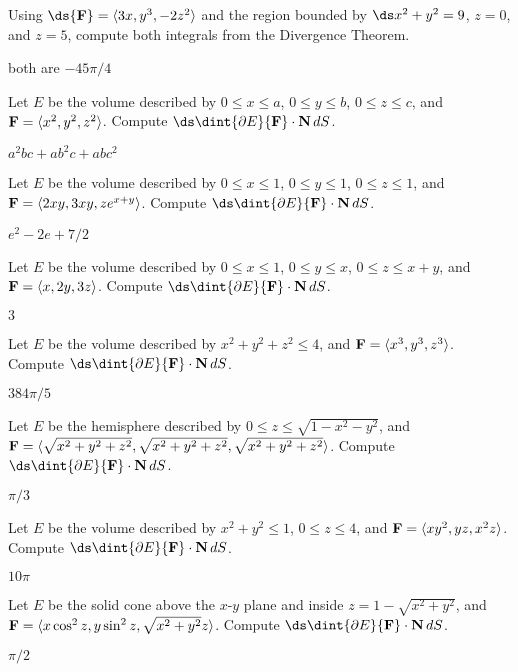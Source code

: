 \begin{exercises}

\exercise Using $\ds{\bf F}=\langle 3x,y^3,-2z^2\rangle$ and the
region bounded by $\ds x^2+y^2=9$, $z=0$, and $z=5$, compute both
integrals from the Divergence Theorem.
\begin{answer} both are $-45\pi/4$
\end{answer}

\exercise Let $E$ be the volume described by 
$0\le x\le a$, $0\le y\le b$, $0\le z\le c$, and 
${\bf F}= \langle x^2,y^2,z^2\rangle$. Compute
$\ds\dint{\partial E} {\bf F}\cdot {\bf N}\,dS$.
\begin{answer} $a^2bc+ab^2c+abc^2$
\end{answer}

\exercise Let $E$ be the volume described by 
$0\le x\le 1$, $0\le y\le 1$, $0\le z\le 1$, and 
${\bf F}= \langle 2xy,3xy,ze^{x+y}\rangle$. Compute
$\ds\dint{\partial E} {\bf F}\cdot {\bf N}\,dS$.
\begin{answer} $e^2-2e+7/2$
\end{answer}

\exercise Let $E$ be the volume described by 
$0\le x\le 1$, $0\le y\le x$, $0\le z\le x+y$, and 
${\bf F}= \langle x,2y,3z\rangle$. Compute
$\ds\dint{\partial E} {\bf F}\cdot {\bf N}\,dS$.
\begin{answer} $3$
\end{answer}

\exercise Let $E$ be the volume described by 
$x^2+y^2+z^2\le 4$, and 
${\bf F}= \langle x^3,y^3,z^3\rangle$. Compute
$\ds\dint{\partial E} {\bf F}\cdot {\bf N}\,dS$.
\begin{answer} $384\pi/5$
\end{answer}

\exercise Let $E$ be the hemisphere described by 
$0\le z\le \sqrt{1-x^2-y^2}$, and \hfill\break
${\bf F}= \langle \sqrt{x^2+y^2+z^2},\sqrt{x^2+y^2+z^2},
\sqrt{x^2+y^2+z^2}\rangle$. Compute
$\ds\dint{\partial E} {\bf F}\cdot {\bf N}\,dS$.
\begin{answer} $\pi/3$
\end{answer}

\exercise Let $E$ be the volume described by 
$x^2+y^2\le1$, $0\le z\le4$, and 
${\bf F}= \langle xy^2,yz,x^2z\rangle$. Compute
$\ds\dint{\partial E} {\bf F}\cdot {\bf N}\,dS$.
\begin{answer} $10\pi$
\end{answer}

\exercise Let $E$ be the solid cone above the $x$-$y$ plane and
inside $z=1-\sqrt{x^2+y^2}$, and 
${\bf F}= \langle x\cos^2 z,y\sin^2z,\sqrt{x^2+y^2}z\rangle$. Compute
$\ds\dint{\partial E} {\bf F}\cdot {\bf N}\,dS$.
\begin{answer} $\pi/2$
\end{answer}


\end{exercises}
